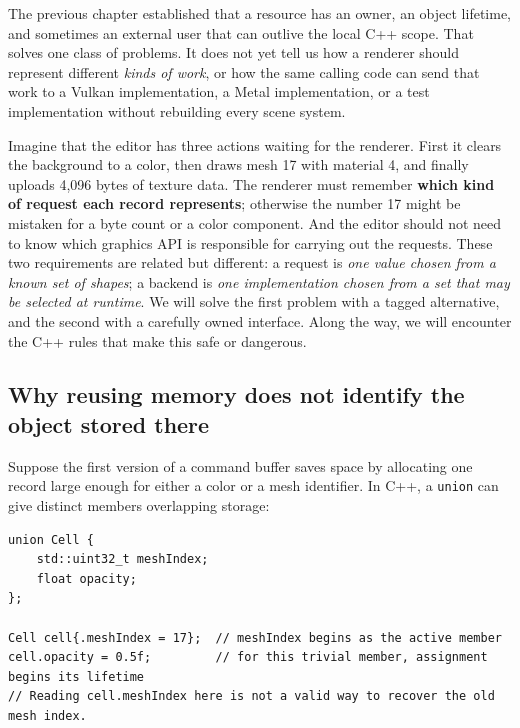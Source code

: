 \hypertarget{05-engine-i-ch004-from-one-owned-resource-to-many-requests-and-a-replaceable-backend}{}

The previous chapter established that a resource has an owner, an object lifetime, and sometimes an external user that can outlive the local C++ scope. That solves one class of problems. It does not yet tell us how a renderer should represent different \emph{kinds of work}, or how the same calling code can send that work to a Vulkan implementation, a Metal implementation, or a test implementation without rebuilding every scene system.

Imagine that the editor has three actions waiting for the renderer. First it clears the background to a color, then draws mesh 17 with material 4, and finally uploads 4,096 bytes of texture data. The renderer must remember \textbf{which kind of request each record represents}; otherwise the number 17 might be mistaken for a byte count or a color component. And the editor should not need to know which graphics API is responsible for carrying out the requests. These two requirements are related but different: a request is \emph{one value chosen from a known set of shapes}; a backend is \emph{one implementation chosen from a set that may be selected at runtime}. We will solve the first problem with a tagged alternative, and the second with a carefully owned interface. Along the way, we will encounter the C++ rules that make this safe or dangerous.

\subsection{Why reusing memory does not identify the object stored there}\label{05-engine-i-ch004-why-reusing-memory-does-not-identify-the-object-stored-there}

\hypertarget{05-engine-i-ch004-why-reusing-memory-does-not-identify-the-object-stored-there}{}

Suppose the first version of a command buffer saves space by allocating one record large enough for either a color or a mesh identifier. In C++, a \texttt{union} can give distinct members overlapping storage:

\begin{verbatim}
union Cell {
    std::uint32_t meshIndex;
    float opacity;
};

Cell cell{.meshIndex = 17};  // meshIndex begins as the active member
cell.opacity = 0.5f;         // for this trivial member, assignment begins its lifetime
// Reading cell.meshIndex here is not a valid way to recover the old mesh index.
\end{verbatim}

